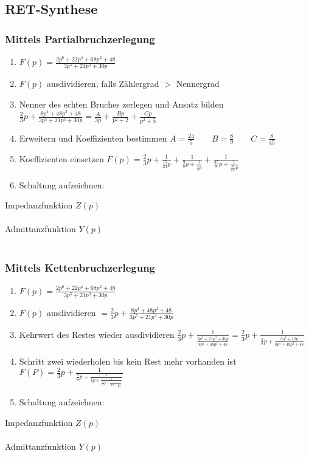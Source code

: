 \subsection{RET-Synthese}
\begin{multicols}{2}
\subsubsection{Mittels Partialbruchzerlegung}
	\begin{enumerate}
	  \item $F(p)=\frac{2p^6+22p^4+68p^2+48}{3p^5+21p^3+30p}$
	  \item $F(p)$ ausdividieren, falls Zählergrad $>$ Nennergrad
	  \item Nenner des echten Bruches zerlegen und Ansatz bilden
	  $\frac{2}{3}p+\frac{8p^4+48p^2+48}{3p^5+21p^3+30p}=\frac{A}{3p}+\frac{Bp}{p^2+2}+\frac{Cp}{p^2+5}$
		\item Erweitern und Koeffizienten bestimmen $A=\frac{24}{5} \qquad
		B=\frac{8}{9} \qquad C=\frac{8}{45}$
		\item Koeffizienten einsetzen
		$F(p)=\frac{2}{3}p+\frac{1}{\frac{15}{24}p}+\frac{1}{\frac{9}{8}p+\frac{1}{\frac{4}{9}p}}+\frac{1}{\frac{45}{8}p+\frac{1}{\frac{8}{255}p}}$
		\item Schaltung aufzeichnen:	  
	\end{enumerate}
	Impedanzfunktion $Z(p)$\\
	\\
	Admittanzfunktion $Y(p)$\\
	\\
\subsubsection{Mittels Kettenbruchzerlegung}
\begin{enumerate}
	\item $F(p)=\frac{2p^6+22p^4+68p^2+48}{3p^5+21p^3+30p}$
	\item $F(p)$ ausdividieren $=\frac{2}{3}p+\frac{8p^4+48p^2+48}{3p^5+21p^3+30p}$
	\item Kehrwert des Restes wieder ausdividieren
	$\frac{2}{3}p+\frac{1}{\frac{3p^5+21p^3+30p}{8p^4+48p^2+48}}=\frac{2}{3}p+\frac{1}{\frac{3}{8}p+\frac{3p^3+12p}{8p^4+48p^2+48}}$
	\item Schritt zwei wiederholen bis kein Rest mehr vorhanden ist
	$F(P)=\frac{2}{3}p+\frac{1}{\frac{3}{8}p+\frac{1}{\frac{8}{3}p+\frac{1}{\frac{3}{16}p+\frac{1}{\frac{16}{3}p+\frac{1}{\frac{1}{16}p}}}}}$
	\item Schaltung aufzeichnen:
\end{enumerate}
Impedanzfunktion $Z(p)$\\
\\
Admittanzfunktion $Y(p)$\\
\\
\end{multicols}


